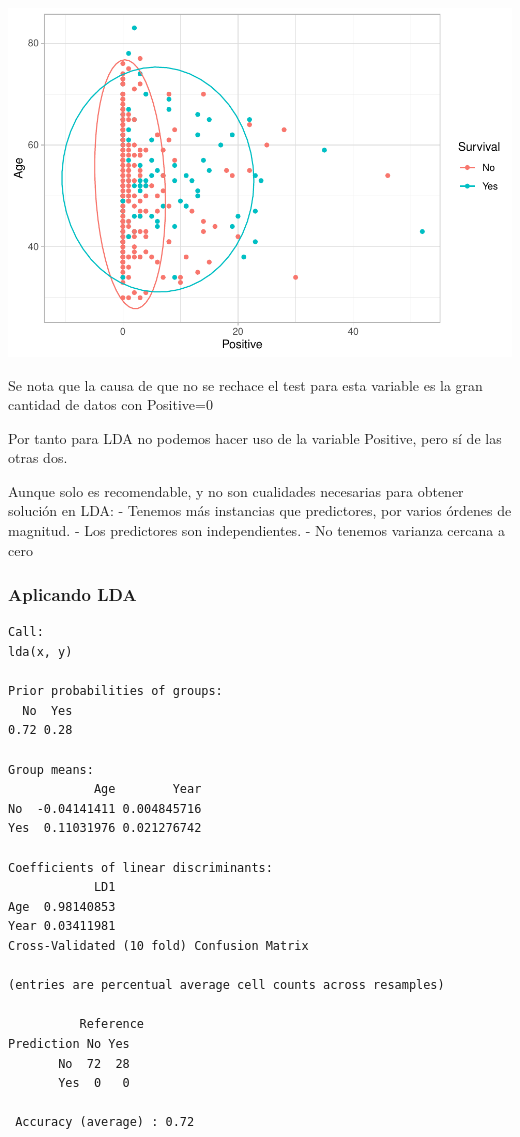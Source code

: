 \documentclass[
]{article}
\begin{document}
\begin{center}\includegraphics{Clasificacion_files/figure-latex/unnamed-chunk-20-3} \end{center}

Se nota que la causa de que no se rechace el test para esta variable es
la gran cantidad de datos con Positive=0

Por tanto para LDA no podemos hacer uso de la variable Positive, pero sí
de las otras dos.

Aunque solo es recomendable, y no son cualidades necesarias para obtener
solución en LDA: - Tenemos más instancias que predictores, por varios
órdenes de magnitud. - Los predictores son independientes. - No tenemos
varianza cercana a cero

\hypertarget{aplicando-lda}{%
\subsubsection{Aplicando LDA}\label{aplicando-lda}}

\begin{verbatim}
Call:
lda(x, y)

Prior probabilities of groups:
  No  Yes 
0.72 0.28 

Group means:
            Age        Year
No  -0.04141411 0.004845716
Yes  0.11031976 0.021276742

Coefficients of linear discriminants:
            LD1
Age  0.98140853
Year 0.03411981
Cross-Validated (10 fold) Confusion Matrix 

(entries are percentual average cell counts across resamples)
 
          Reference
Prediction No Yes
       No  72  28
       Yes  0   0
                          
 Accuracy (average) : 0.72
\end{verbatim}
\end{document}
